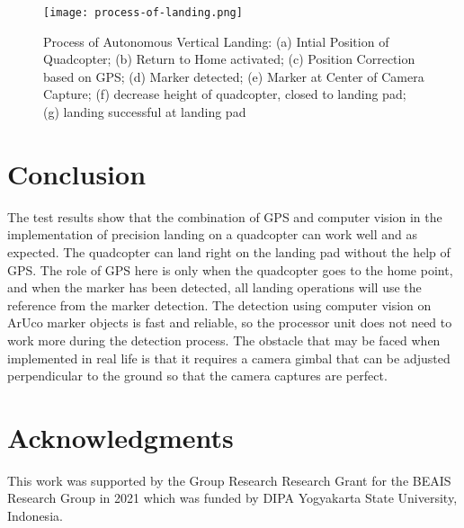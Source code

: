 \documentclass[a4paper]{jpconf}
\begin{document}
\begin{figure}[h]
    \centering
    \texttt{[image: process-of-landing.png]}
    \caption{\label{label}Process of Autonomous Vertical Landing: (a) Intial Position of Quadcopter; (b) Return to Home activated; (c) Position Correction based on GPS; (d) Marker detected; (e) Marker at Center of Camera Capture; (f) decrease height of quadcopter, closed to landing pad; (g) landing successful at landing pad}
\end{figure}

\section{Conclusion}
The test results show that the combination of GPS and computer vision in the implementation of precision landing on a quadcopter can work well and as expected. The quadcopter can land right on the landing pad without the help of GPS. The role of GPS here is only when the quadcopter goes to the home point, and when the marker has been detected, all landing operations will use the reference from the marker detection. The detection using computer vision on ArUco marker objects is fast and reliable, so the processor unit does not need to work more during the detection process. The obstacle that may be faced when implemented in real life is that it requires a camera gimbal that can be adjusted perpendicular to the ground so that the camera captures are perfect.

\section*{Acknowledgments}
This work was supported by the Group Research Research Grant for the BEAIS Research Group in 2021 which was funded by DIPA Yogyakarta State University, Indonesia.
\end{document}
